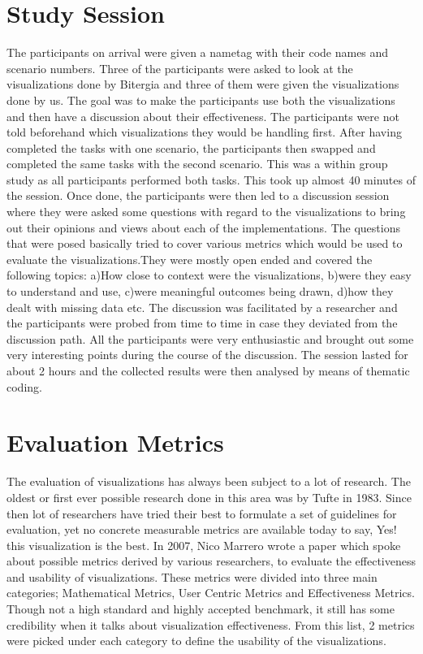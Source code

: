 \documentclass[seploa]{beavtex}
\begin{document}
\section{Study Session}
The participants on arrival were given a nametag with their code names and scenario numbers. Three of the participants were asked to look at the visualizations done by Bitergia and three of them were given the visualizations done by us. The goal was to make the participants use both the visualizations and then have a discussion about their effectiveness. The participants were not told beforehand which visualizations they would be handling first. After having completed the tasks with one scenario, the participants then swapped and completed the same tasks with the second scenario. This was a within group study as all participants performed both tasks. This took up almost 40 minutes of the session. Once done, the participants were then led to a discussion session where they were asked some questions with regard to the visualizations to bring out their opinions and views about each of the implementations. The questions that were posed basically tried to cover various metrics which would be used to evaluate the visualizations.They were mostly open ended and covered the following topics: a)How close to context were the visualizations, b)were they easy to understand and use, c)were meaningful outcomes being drawn, d)how they dealt with missing data etc. The discussion was facilitated by a researcher and the participants were probed from time to time in case they deviated from the discussion path. All the participants were very enthusiastic and brought out some very interesting points during the course of the discussion. The session lasted for about 2 hours and the collected results were then analysed by means of thematic coding.

\section{Evaluation Metrics}
The evaluation of visualizations has always been subject to a lot of research. The oldest or first ever possible research done in this area was by Tufte in 1983\cite{tufte1983}. Since then lot of researchers have tried their best to formulate a set of guidelines for evaluation, yet no concrete measurable metrics are available today to say, Yes! this visualization is the best. In 2007, Nico Marrero wrote a paper which spoke about possible metrics derived by various researchers, to evaluate the effectiveness and usability of visualizations\cite{nico2007}. These metrics were divided into three main categories; Mathematical Metrics, User Centric Metrics and Effectiveness Metrics. Though not a high standard and highly accepted benchmark, it still has some credibility when it talks about visualization effectiveness. From this list, 2 metrics were picked under each category to define the usability of the visualizations.
\end{document}
